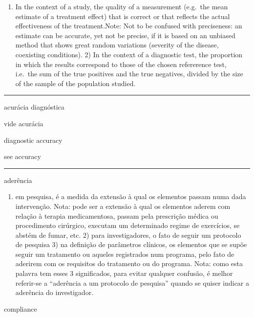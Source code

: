 \documentclass[
  openany]{book}
\providecommand{\tightlist}{%
  \setlength{\itemsep}{0pt}\setlength{\parskip}{0pt}}
\begin{document}
\begin{enumerate}
\def\labelenumi{\arabic{enumi})}
\tightlist
\item
  In the context of a study, the quality of a measurement (e.g.~the mean estimate of a treatment effect) that is correct or that reflects the actual effectiveness of the treatment.Note: Not to be confused with preciseness: an estimate can be accurate, yet not be precise, if it is based on an unbiased method that shows great random variations (severity of the disease, coexisting conditions). 2) In the context of a diagnostic test, the proportion in which the results correspond to those of the chosen refererence test, i.e.~the sum of the true positives and the true negatives, divided by the size of the sample of the population studied.
\end{enumerate}

\begin{center}\rule{0.5\linewidth}{0.5pt}\end{center}

acurácia diagnóstica

vide acurácia

diagnostic accuracy

see accuracy

\begin{center}\rule{0.5\linewidth}{0.5pt}\end{center}

aderência

\begin{enumerate}
\def\labelenumi{\arabic{enumi})}
\tightlist
\item
  em pesquisa, é a medida da extensão à qual os elementos passam numa dada intervenção. Nota: pode ser a extensão à qual os elementos aderem com relação à terapia medicamentosa, passam pela prescrição médica ou procedimento cirúrgico, executam um determinado regime de exercícios, se abstém de fumar, etc. 2) para investigadores, o fato de seguir um protocolo de pesquisa 3) na definição de parâmetros clínicos, os elementos que se supõe seguir um tratamento ou aqueles registrados num programa, pelo fato de aderirem com os requisitos do tratamento ou do programa. Nota: como esta palavra tem esses 3 significados, para evitar qualquer confusão, é melhor referir-se a ``aderência a um protocolo de pesquisa'' quando se quiser indicar a aderência do investigador.
\end{enumerate}

compliance
\end{document}
